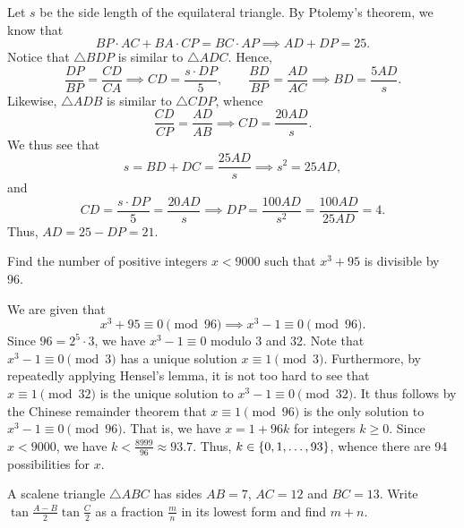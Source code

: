 Let $s$ be the side length of the equilateral triangle. By Ptolemy's theorem, we know that \[BP \cdot AC + BA \cdot CP = BC \cdot AP \implies AD + DP = 25.\] Notice that $\triangle BDP$ is similar to $\triangle ADC$. Hence, \[\frac{DP}{BP} = \frac{CD}{CA} \implies CD = \frac{s \cdot DP}{5}, \qquad \frac{BD}{BP} = \frac{AD}{AC} \implies BD = \frac{5 AD}{s}.\] Likewise, $\triangle ADB$ is similar to $\triangle CDP$, whence \[\frac{CD}{CP} = \frac{AD}{AB} \implies CD = \frac{20 AD}{s}.\] We thus see that \[s = BD + DC = \frac{25 AD}{s} \implies s^2 = 25 AD,\] and \[CD = \frac{s \cdot DP}{5} = \frac{20 AD}{s} \implies DP = \frac{100 AD}{s^2} = \frac{100 AD}{25 AD} = 4.\] Thus, $AD = 25 - DP = 21$.

\begin{question}[94]\label{A::2024-S-1-24}
    Find the number of positive integers $x < 9000$ such that $x^3 + 95$ is divisible by 96.
\end{question}

We are given that \[x^3 + 95 \equiv 0 \pmod{96} \implies x^3  - 1 \equiv 0 \pmod{96}.\] Since $96 = 2^5 \cdot 3$, we have $x^3 - 1 \equiv 0$ modulo 3 and 32. Note that $x^3 - 1 \equiv 0 \pmod{3}$ has a unique solution $x \equiv 1 \pmod{3}$. Furthermore, by repeatedly applying Hensel's lemma, it is not too hard to see that $x \equiv 1 \pmod{32}$ is the unique solution to $x^3 - 1 \equiv 0 \pmod{32}$. It thus follows by the Chinese remainder theorem that $x \equiv 1 \pmod{96}$ is the only solution to $x^3 - 1 \equiv 0 \pmod{96}$. That is, we have $x = 1 + 96k$ for integers $k \geq 0$. Since $x < 9000$, we have $k < \frac{8999}{96} \approx 93.7$. Thus, $k \in \left\lbrace 0, 1, \ldots, 93 \right\rbrace$, whence there are 94 possibilities for $x$.

\begin{question}[26]\label{A::2024-S-1-25}
    A scalene triangle $\triangle ABC$ has sides $AB = 7$, $AC = 12$ and $BC = 13$. Write $\tan \frac{A-B}{2} \tan \frac{C}{2}$ as a fraction $\frac{m}{n}$ in its lowest form and find $m + n$.

    \begin{center}
    \end{center}
\end{question}

